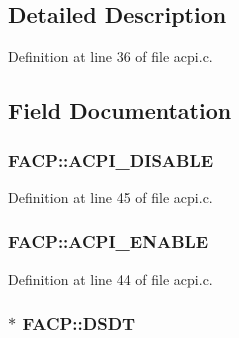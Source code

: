 \subsection{Detailed Description}


Definition at line 36 of file acpi.\+c.



\subsection{Field Documentation}
\subsubsection[{\texorpdfstring{A\+C\+P\+I\+\_\+\+D\+I\+S\+A\+B\+LE}{ACPI_DISABLE}}]{ F\+A\+C\+P\+::\+A\+C\+P\+I\+\_\+\+D\+I\+S\+A\+B\+LE}\hypertarget{structFACP_ac7a25cb3b147fd2824eee9c6fe06f2e3}{}\label{structFACP_ac7a25cb3b147fd2824eee9c6fe06f2e3}


Definition at line 45 of file acpi.\+c.

\subsubsection[{\texorpdfstring{A\+C\+P\+I\+\_\+\+E\+N\+A\+B\+LE}{ACPI_ENABLE}}]{ F\+A\+C\+P\+::\+A\+C\+P\+I\+\_\+\+E\+N\+A\+B\+LE}\hypertarget{structFACP_a0ce6f514986cb7577fd80249528d4bf0}{}\label{structFACP_a0ce6f514986cb7577fd80249528d4bf0}


Definition at line 44 of file acpi.\+c.

\subsubsection[{\texorpdfstring{D\+S\+DT}{DSDT}}]{$\ast$ F\+A\+C\+P\+::\+D\+S\+DT}\hypertarget{structFACP_ae9d89be6ba26f7c9109d901c2daa3a75}{}\label{structFACP_ae9d89be6ba26f7c9109d901c2daa3a75}


